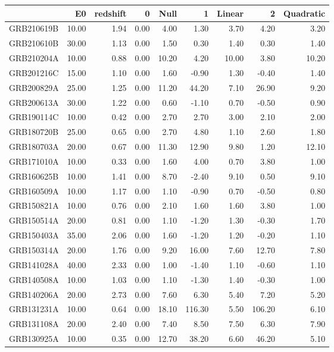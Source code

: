 \begin{tabular}{lrrrrrrrr}
\toprule
 & E0 & redshift & 0 & Null & 1 & Linear & 2 & Quadratic \\
\midrule
GRB210619B & 10.00 & 1.94 & 0.00 & 4.00 & 1.30 & 3.70 & 4.20 & 3.20 \\
GRB210610B & 30.00 & 1.13 & 0.00 & 1.50 & 0.30 & 1.40 & 0.30 & 1.40 \\
GRB210204A & 10.00 & 0.88 & 0.00 & 10.20 & 4.20 & 10.00 & 3.80 & 10.20 \\
GRB201216C & 15.00 & 1.10 & 0.00 & 1.60 & -0.90 & 1.30 & -0.40 & 1.40 \\
GRB200829A & 25.00 & 1.25 & 0.00 & 11.20 & 44.20 & 7.10 & 26.90 & 9.20 \\
GRB200613A & 30.00 & 1.22 & 0.00 & 0.60 & -1.10 & 0.70 & -0.50 & 0.90 \\
GRB190114C & 10.00 & 0.42 & 0.00 & 2.70 & 2.70 & 3.00 & 2.10 & 2.00 \\
GRB180720B & 25.00 & 0.65 & 0.00 & 2.70 & 4.80 & 1.10 & 2.60 & 1.80 \\
GRB180703A & 20.00 & 0.67 & 0.00 & 11.30 & 12.90 & 9.80 & 1.20 & 12.10 \\
GRB171010A & 10.00 & 0.33 & 0.00 & 1.60 & 4.00 & 0.70 & 3.80 & 1.00 \\
GRB160625B & 10.00 & 1.41 & 0.00 & 8.70 & -2.40 & 9.10 & 0.50 & 9.10 \\
GRB160509A & 10.00 & 1.17 & 0.00 & 1.10 & -0.90 & 0.70 & -0.50 & 0.80 \\
GRB150821A & 10.00 & 0.76 & 0.00 & 2.10 & 1.60 & 1.60 & 3.80 & 1.00 \\
GRB150514A & 20.00 & 0.81 & 0.00 & 1.10 & -1.20 & 1.30 & -0.30 & 1.70 \\
GRB150403A & 35.00 & 2.06 & 0.00 & 1.60 & -1.20 & 1.20 & -0.20 & 1.10 \\
GRB150314A & 20.00 & 1.76 & 0.00 & 9.20 & 16.00 & 7.60 & 12.70 & 7.80 \\
GRB141028A & 40.00 & 2.33 & 0.00 & 1.00 & -1.40 & 1.10 & -0.60 & 1.10 \\
GRB140508A & 10.00 & 1.03 & 0.00 & 1.10 & -1.30 & 1.40 & -0.30 & 1.00 \\
GRB140206A & 20.00 & 2.73 & 0.00 & 7.60 & 6.30 & 5.40 & 7.20 & 5.20 \\
GRB131231A & 10.00 & 0.64 & 0.00 & 18.10 & 116.30 & 5.50 & 106.20 & 6.10 \\
GRB131108A & 20.00 & 2.40 & 0.00 & 7.40 & 8.50 & 7.50 & 6.30 & 7.90 \\
GRB130925A & 10.00 & 0.35 & 0.00 & 12.70 & 38.20 & 6.60 & 46.20 & 5.10 \\

\end{tabular}
